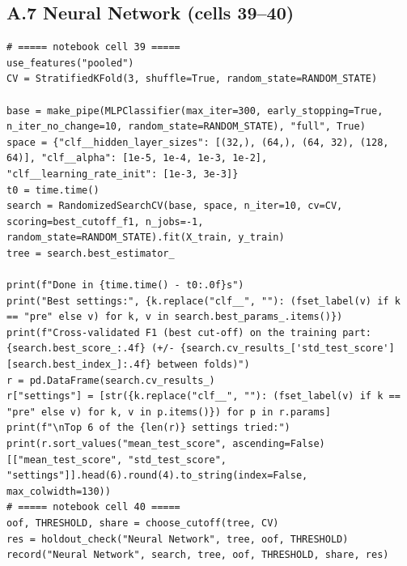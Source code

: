 \documentclass[12pt,a4paper]{article}
\begin{document}
\subsection*{A.7 Neural Network (cells 39--40)}
\begin{lstlisting}[style=code]
# ===== notebook cell 39 =====
use_features("pooled")
CV = StratifiedKFold(3, shuffle=True, random_state=RANDOM_STATE)

base = make_pipe(MLPClassifier(max_iter=300, early_stopping=True, n_iter_no_change=10, random_state=RANDOM_STATE), "full", True)
space = {"clf__hidden_layer_sizes": [(32,), (64,), (64, 32), (128, 64)], "clf__alpha": [1e-5, 1e-4, 1e-3, 1e-2], "clf__learning_rate_init": [1e-3, 3e-3]}
t0 = time.time()
search = RandomizedSearchCV(base, space, n_iter=10, cv=CV, scoring=best_cutoff_f1, n_jobs=-1, random_state=RANDOM_STATE).fit(X_train, y_train)
tree = search.best_estimator_

print(f"Done in {time.time() - t0:.0f}s")
print("Best settings:", {k.replace("clf__", ""): (fset_label(v) if k == "pre" else v) for k, v in search.best_params_.items()})
print(f"Cross-validated F1 (best cut-off) on the training part: {search.best_score_:.4f} (+/- {search.cv_results_['std_test_score'][search.best_index_]:.4f} between folds)")
r = pd.DataFrame(search.cv_results_)
r["settings"] = [str({k.replace("clf__", ""): (fset_label(v) if k == "pre" else v) for k, v in p.items()}) for p in r.params]
print(f"\nTop 6 of the {len(r)} settings tried:")
print(r.sort_values("mean_test_score", ascending=False)[["mean_test_score", "std_test_score", "settings"]].head(6).round(4).to_string(index=False, max_colwidth=130))
# ===== notebook cell 40 =====
oof, THRESHOLD, share = choose_cutoff(tree, CV)
res = holdout_check("Neural Network", tree, oof, THRESHOLD)
record("Neural Network", search, tree, oof, THRESHOLD, share, res)
\end{lstlisting}
\end{document}
